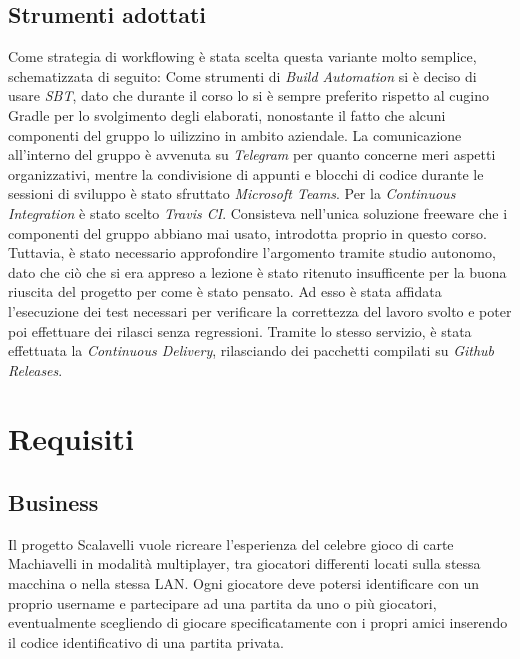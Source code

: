 \documentclass{article}
\begin{document}
    \subsection{Strumenti adottati}
    Come strategia di workflowing è stata scelta questa variante molto semplice, schematizzata di seguito:
    Come strumenti di \textit{Build Automation} si è deciso di usare \textit{SBT}, dato che durante il corso lo si è
    sempre preferito rispetto al cugino Gradle per lo svolgimento degli elaborati, nonostante il fatto che alcuni
    componenti del gruppo lo uilizzino in ambito aziendale.
    La comunicazione all'interno del gruppo è avvenuta su \textit{Telegram} per quanto concerne meri aspetti
    organizzativi, mentre la condivisione di appunti e blocchi di codice durante le sessioni di sviluppo è stato
    sfruttato \textit{Microsoft Teams}.
    Per la \textit{Continuous Integration} è stato scelto \textit{Travis CI}. Consisteva nell'unica soluzione freeware
    che i componenti del gruppo abbiano mai usato, introdotta proprio in questo corso. Tuttavia, è stato necessario
    approfondire l'argomento tramite studio autonomo, dato che ciò che si era appreso a lezione è stato ritenuto
    insufficente per la buona riuscita del progetto per come è stato pensato. Ad esso è stata affidata l'esecuzione dei
    test necessari per verificare la correttezza del lavoro svolto e poter poi effettuare dei rilasci senza regressioni.
    Tramite lo stesso servizio, è stata effettuata la \textit{Continuous Delivery}, rilasciando dei pacchetti compilati
    su \textit{Github Releases}.

    \newpage


    \section{Requisiti}\label{sec:requisiti}

    \subsection{Business}\label{subsec:business}

    Il progetto Scalavelli vuole ricreare l’esperienza del celebre gioco di carte Machiavelli in modalità multiplayer,
    tra giocatori differenti locati sulla stessa macchina o nella stessa LAN. Ogni giocatore deve potersi identificare
    con un proprio username e partecipare ad una partita da uno o più giocatori, eventualmente scegliendo di giocare
    specificatamente con i propri amici inserendo il codice identificativo di una partita privata.
\end{document}
